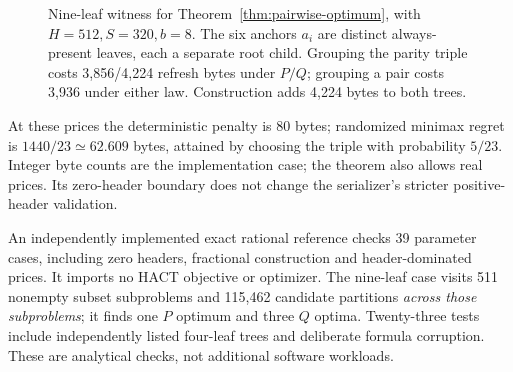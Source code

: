 \documentclass[10pt,journal,compsoc]{IEEEtran}
\theoremstyle{definition}\newtheorem{definition}[theorem]{Definition}
\begin{document}
\begin{figure}[t]\centering
{}
\caption{Nine-leaf witness for Theorem~\ref{thm:pairwise-optimum}, with
$H=512,S=320,b=8$. The six anchors $a_i$ are distinct always-present
leaves, each a separate root child. Grouping the parity triple costs
3,856/4,224 refresh bytes under $P/Q$; grouping a pair costs 3,936
under either law. Construction adds 4,224 bytes to both trees.}
\label{fig:pairwise-witness}
\end{figure}

At these prices the deterministic penalty is 80 bytes; randomized minimax
regret is $1440/23\simeq62.609$ bytes, attained by choosing the triple with
probability $5/23$. Integer byte counts are the implementation case; the
theorem also allows real prices. Its zero-header boundary does not change
the serializer's stricter positive-header validation.

An independently implemented exact rational reference checks 39 parameter
cases, including zero headers, fractional construction and header-dominated
prices. It imports no HACT objective or optimizer. The nine-leaf case visits
511 nonempty subset subproblems and 115,462 candidate partitions \emph{across
those subproblems}; it finds one $P$ optimum and three $Q$ optima. Twenty-three
tests include independently listed four-leaf trees and deliberate formula
corruption. These are analytical checks, not additional software workloads.
\end{document}
